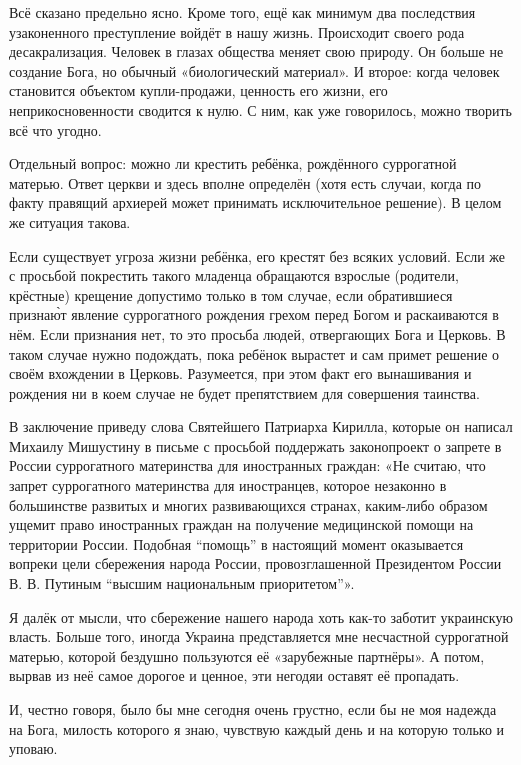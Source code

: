 Всё сказано предельно ясно. Кроме того, ещё как минимум два последствия
узаконенного преступление войдёт в нашу жизнь. Происходит своего рода
десакрализация. Человек в глазах общества меняет свою природу. Он больше не
создание Бога, но обычный «биологический материал». И второе: когда человек
становится объектом купли-продажи, ценность его жизни, его неприкосновенности
сводится к нулю. С ним, как уже говорилось, можно творить всё что угодно.

Отдельный вопрос: можно ли крестить ребёнка, рождённого суррогатной матерью.
Ответ церкви и здесь вполне определён (хотя есть случаи, когда по факту
правящий архиерей может принимать исключительное решение). В целом же ситуация
такова.

Если существует угроза жизни ребёнка, его крестят без всяких условий. Если же с
просьбой покрестить такого младенца обращаются взрослые (родители, крёстные)
крещение допустимо только в том случае, если обратившиеся признаю̀т явление
суррогатного рождения грехом перед Богом и раскаиваются в нём. Если признания
нет, то это просьба людей, отвергающих Бога и Церковь. В таком случае нужно
подождать, пока ребёнок вырастет и сам примет решение о своём вхождении в
Церковь. Разумеется, при этом факт его вынашивания и рождения ни в коем случае
не будет препятствием для совершения таинства.

В заключение приведу слова Святейшего Патриарха Кирилла, которые он написал
Михаилу Мишустину в письме с просьбой поддержать законопроект о запрете в
России суррогатного материнства для иностранных граждан: «Не считаю, что запрет
суррогатного материнства для иностранцев, которое незаконно в большинстве
развитых и многих развивающихся странах, каким-либо образом ущемит право
иностранных граждан на получение медицинской помощи на территории России.
Подобная \enquote{помощь} в настоящий момент оказывается вопреки цели сбережения народа
России, провозглашенной Президентом России В. В. Путиным \enquote{высшим национальным
приоритетом}».

Я далёк от мысли, что сбережение нашего народа хоть как-то заботит украинскую
власть. Больше того, иногда Украина представляется мне несчастной суррогатной
матерью, которой бездушно пользуются её «зарубежные партнёры». А потом, вырвав
из неё самое дорогое и ценное, эти негодяи оставят её пропадать.

И, честно говоря, было бы мне сегодня очень грустно, если бы не моя надежда на
Бога, милость которого я знаю, чувствую каждый день и на которую только и
уповаю.
